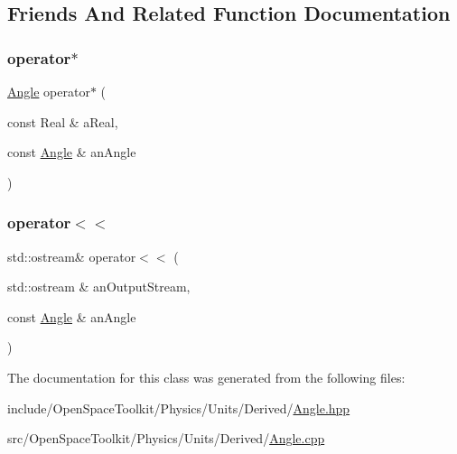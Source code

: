 \subsection{Friends And Related Function Documentation}
\mbox{\label{classostk_1_1physics_1_1units_1_1_angle_af699984b24759466957ecddaa7e61fc9}} 
\subsubsection{\texorpdfstring{operator$\ast$}{operator*}}
{\footnotesize\ttfamily \hyperlink{classostk_1_1physics_1_1units_1_1_angle}{Angle} operator$\ast$ (\begin{DoxyParamCaption}\item[{const Real \&}]{a\+Real,  }\item[{const \hyperlink{classostk_1_1physics_1_1units_1_1_angle}{Angle} \&}]{an\+Angle }\end{DoxyParamCaption})\hspace{0.3cm}{\ttfamily [friend]}}

\mbox{\label{classostk_1_1physics_1_1units_1_1_angle_a0846b77ee3281e8a559197c3c3208eed}} 
\subsubsection{\texorpdfstring{operator$<$$<$}{operator<<}}
{\footnotesize\ttfamily std\+::ostream\& operator$<$$<$ (\begin{DoxyParamCaption}\item[{std\+::ostream \&}]{an\+Output\+Stream,  }\item[{const \hyperlink{classostk_1_1physics_1_1units_1_1_angle}{Angle} \&}]{an\+Angle }\end{DoxyParamCaption})\hspace{0.3cm}{\ttfamily [friend]}}



The documentation for this class was generated from the following files\+:\begin{DoxyCompactItemize}
\item 
include/\+Open\+Space\+Toolkit/\+Physics/\+Units/\+Derived/\hyperlink{_angle_8hpp}{Angle.\+hpp}\item 
src/\+Open\+Space\+Toolkit/\+Physics/\+Units/\+Derived/\hyperlink{_angle_8cpp}{Angle.\+cpp}\end{DoxyCompactItemize}
